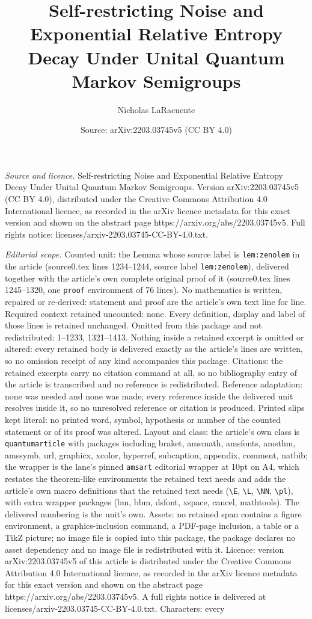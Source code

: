 \documentclass[10pt,a4paper]{amsart}
\title[Self-restricting Noise and Exponential Relative Entropy Deca]{Self-restricting Noise and Exponential Relative Entropy Decay Under Unital Quantum Markov Semigroups}
\author{Nicholas LaRacuente}
\date{Source: arXiv:2203.03745v5 (CC BY 4.0)}
\begin{document}
\maketitle

\noindent\emph{Source and licence.} Self-restricting Noise and Exponential Relative Entropy Decay Under Unital Quantum Markov Semigroups. Version arXiv:2203.03745v5 (CC BY 4.0), distributed under the Creative Commons Attribution 4.0 International licence, as recorded in the arXiv licence metadata for this exact version and shown on the abstract page https://arxiv.org/abs/2203.03745v5. Full rights notice: licenses/arxiv-2203.03745-CC-BY-4.0.txt.\par\smallskip

\noindent\textit{Editorial scope.} Counted unit: the Lemma whose source label is \texttt{lem:zenolem} in the article (source0.tex lines 1234--1244, source label \texttt{lem:zenolem}), delivered together with the article's own complete original proof of it (source0.tex lines 1245--1320, one \texttt{proof} environment of 76 lines). No mathematics is written, repaired or re-derived: statement and proof are the article's own text line for line. Required context retained uncounted: none. Every definition, display and label of those lines is retained unchanged. Omitted from this package and not redistributed: 1--1233, 1321--1413. Nothing inside a retained excerpt is omitted or altered: every retained body is delivered exactly as the article's lines are written, so no omission receipt of any kind accompanies this package. Citations: the retained excerpts carry no citation command at all, so no bibliography entry of the article is transcribed and no reference is redistributed. Reference adaptation: none was needed and none was made; every reference inside the delivered unit resolves inside it, so no unresolved reference or citation is produced. Printed slips kept literal: no printed word, symbol, hypothesis or number of the counted statement or of its proof was altered. Layout and class: the article's own class is \texttt{quantumarticle} with packages including braket, amsmath, amsfonts, amsthm, amssymb, url, graphicx, xcolor, hyperref, subcaption, appendix, comment, natbib; the wrapper is the lane's pinned \texttt{amsart} editorial wrapper at 10pt on A4, which restates the theorem-like environments the retained text needs and adds the article's own macro definitions that the retained text needs (\texttt{\textbackslash E}, \texttt{\textbackslash L}, \texttt{\textbackslash NN}, \texttt{\textbackslash pl}), with extra wrapper packages (bm, bbm, dsfont, xspace, cancel, mathtools). The delivered numbering is the unit's own. Assets: no retained span contains a figure environment, a graphics-inclusion command, a PDF-page inclusion, a table or a TikZ picture; no image file is copied into this package, the package declares no asset dependency and no image file is redistributed with it. Licence: version arXiv:2203.03745v5 of this article is distributed under the Creative Commons Attribution 4.0 International licence, as recorded in the arXiv licence metadata for this exact version and shown on the abstract page https://arxiv.org/abs/2203.03745v5. A full rights notice is delivered at licenses/arxiv-2203.03745-CC-BY-4.0.txt. Characters: every 
\end{document}
